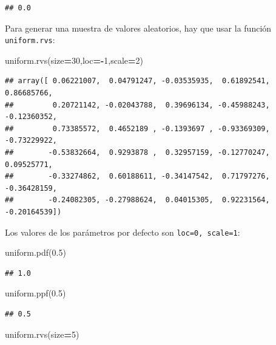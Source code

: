 \documentclass[]{book}
\newenvironment{Shaded}{\begin{snugshade}}{\end{snugshade}}
\newcommand{\DecValTok}[1]{\textcolor[rgb]{0.00,0.00,0.81}{#1}}
\newcommand{\FloatTok}[1]{\textcolor[rgb]{0.00,0.00,0.81}{#1}}
\newcommand{\NormalTok}[1]{#1}
\newcommand{\OperatorTok}[1]{\textcolor[rgb]{0.81,0.36,0.00}{\textbf{#1}}}
\begin{document}
\begin{verbatim}
## 0.0
\end{verbatim}

Para generar una muestra de valores aleatorios, hay que usar la función \texttt{uniform.rvs}:

\begin{Shaded}
\begin{Highlighting}[]
\NormalTok{uniform.rvs(size}\OperatorTok{=}\DecValTok{30}\NormalTok{,loc}\OperatorTok{=-}\DecValTok{1}\NormalTok{,scale}\OperatorTok{=}\DecValTok{2}\NormalTok{)}
\end{Highlighting}
\end{Shaded}

\begin{verbatim}
## array([ 0.06221007,  0.04791247, -0.03535935,  0.61892541,  0.86685766,
##         0.20721142, -0.02043788,  0.39696134, -0.45988243, -0.12360352,
##         0.73385572,  0.4652189 , -0.1393697 , -0.93369309, -0.73229922,
##        -0.53832664,  0.9293878 ,  0.32957159, -0.12770247,  0.09525771,
##        -0.33274862,  0.60188611, -0.34147542,  0.71797276, -0.36428159,
##        -0.24082305, -0.27988624,  0.04015305,  0.92231564, -0.20164539])
\end{verbatim}

Los valores de los parámetros por defecto son \texttt{loc=0,\ scale=1}:

\begin{Shaded}
\begin{Highlighting}[]
\NormalTok{uniform.pdf(}\FloatTok{0.5}\NormalTok{)}
\end{Highlighting}
\end{Shaded}

\begin{verbatim}
## 1.0
\end{verbatim}

\begin{Shaded}
\begin{Highlighting}[]
\NormalTok{uniform.ppf(}\FloatTok{0.5}\NormalTok{)}
\end{Highlighting}
\end{Shaded}

\begin{verbatim}
## 0.5
\end{verbatim}

\begin{Shaded}
\begin{Highlighting}[]
\NormalTok{uniform.rvs(size}\OperatorTok{=}\DecValTok{5}\NormalTok{)}
\end{Highlighting}
\end{Shaded}
\end{document}
